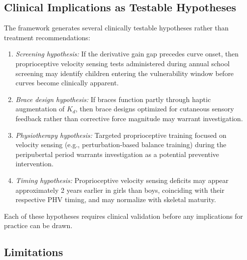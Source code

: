 \documentclass[12pt,a4paper]{article}
\begin{document}
\subsection{Clinical Implications as Testable Hypotheses}

The framework generates several clinically testable hypotheses rather than treatment recommendations:

\begin{enumerate}
\item \textit{Screening hypothesis:} If the derivative gain gap precedes curve onset, then proprioceptive velocity sensing tests administered during annual school screening may identify children entering the vulnerability window before curves become clinically apparent.

\item \textit{Brace design hypothesis:} If braces function partly through haptic augmentation of $K_d$, then brace designs optimized for cutaneous sensory feedback rather than corrective force magnitude may warrant investigation.

\item \textit{Physiotherapy hypothesis:} Targeted proprioceptive training focused on velocity sensing (e.g., perturbation-based balance training) during the peripubertal period warrants investigation as a potential preventive intervention.

\item \textit{Timing hypothesis:} Proprioceptive velocity sensing deficits may appear approximately 2 years earlier in girls than boys, coinciding with their respective PHV timing, and may normalize with skeletal maturity.
\end{enumerate}

Each of these hypotheses requires clinical validation before any implications for practice can be drawn.

\subsection{Limitations}
\end{document}
